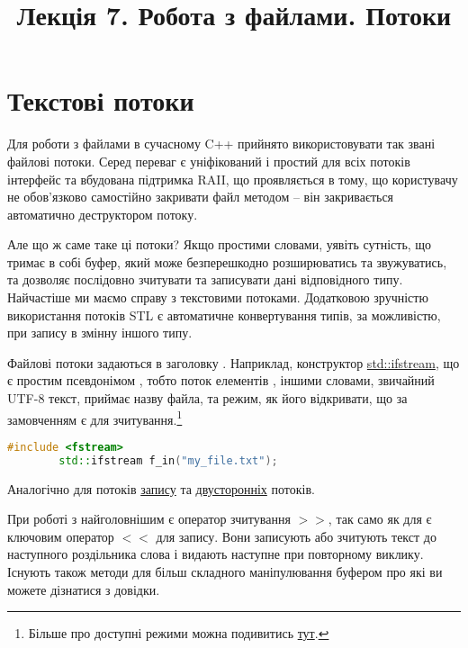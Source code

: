 \documentclass[12pt]{article}
\title{Лекція 7. Робота з файлами. Потоки}
\begin{document}
	\maketitle

	\tableofcontents
	
	\section{Текстові потоки}
    Для роботи з файлами в сучасному C++ прийнято використовувати так звані файлові потоки. Серед переваг є уніфікований і простий для всіх потоків інтерфейс та вбудована підтримка RAII, що проявляється в тому, що користувачу не обов'язково самостійно закривати файл методом  -- він закривається автоматично деструктором потоку.

    Але що ж саме таке ці потоки? Якщо простими словами, уявіть сутність, що тримає в собі буфер, який може безперешкодно розширюватись та звужуватись, та дозволяє послідовно зчитувати та записувати дані відповідного типу. Найчастіше ми маємо справу з текстовими потоками. Додатковою зручністю використання потоків STL є автоматичне конвертування типів, за можливістю, при запису в змінну іншого типу.

    Файлові потоки задаються в заголовку . Наприклад, конструктор \href{https://en.cppreference.com/w/cpp/io/basic_ifstream/basic_ifstream}{std::ifstream}, що є простим псевдонімом , тобто поток елементів , іншими словами, звичайний UTF-8 текст, приймає назву файла, та режим, як його відкривати, що за замовченням є для зчитування.\footnote{Більше про доступні режими можна подивитись \href{https://en.cppreference.com/w/cpp/io/ios_base/openmode}{тут}.}
    \begin{lstlisting}[language=c++]
        #include <fstream>
        std::ifstream f_in("my_file.txt");
    \end{lstlisting}

    Аналогічно для потоків \href{https://en.cppreference.com/w/cpp/io/basic_ofstream}{запису} та \href{https://en.cppreference.com/w/cpp/io/basic_fstream}{двусторонніх} потоків.

    При роботі з  найголовнішим є оператор зчитування $>>$, так само як для  є ключовим оператор $<<$ для запису. Вони записують або зчитують текст до наступного роздільника слова і видають наступне при повторному виклику. Існують також методи для більш складного маніпулювання буфером про які ви можете дізнатися з довідки.
\end{document}
